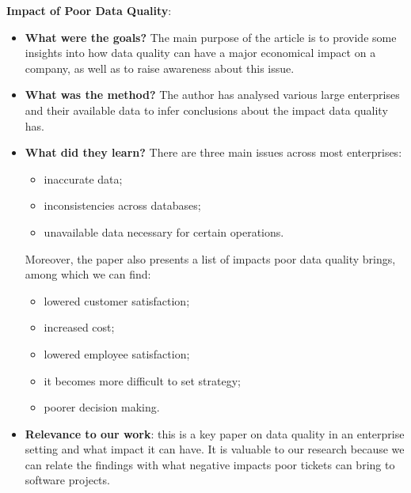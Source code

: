 \documentclass{mprop}
\begin{document}
\textbf{Impact of Poor Data Quality}\cite{redman1998impact}:
\begin{itemize}
  \item \textbf{What were the goals?}
    The main purpose of the article is to provide some insights into how
    data quality can have a major economical impact on a company, as well
    as to raise awareness about this issue.
  \item \textbf{What was the method?}
    The author has analysed various large enterprises and their available data 
    to infer conclusions about the impact data quality has.
  \item \textbf{What did they learn?}
    There are three main issues across most enterprises:
      \begin{itemize}
        \item inaccurate data;
        \item inconsistencies across databases;
        \item unavailable data necessary for certain operations.
      \end{itemize}
    Moreover, the paper also presents a list of impacts poor data quality brings, among 
    which we can find:
      \begin{itemize}
        \item lowered customer satisfaction;
        \item increased cost;
        \item lowered employee satisfaction;
        \item it becomes more difficult to set strategy;
        \item poorer decision making.
      \end{itemize}
  \item \textbf{Relevance to our work}: this is a key paper on data quality in
    an enterprise setting and what impact it can have. It is valuable to our research 
    because we can relate the findings with what negative impacts poor tickets
    can bring to software projects.
\end{itemize}
\end{document}
